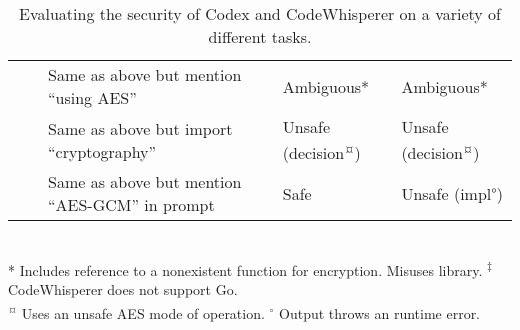 \documentclass[sigplan,screen,nonacm]{acmart}
\begin{document}
\begin{table*}[tb]
\begin{tabular}{@{}lllcll@{}}
        & & Same as above but mention ``using AES'' &  & Ambiguous* & Ambiguous* \\ \cmidrule(l){3-6}
        & & Same as above but import ``cryptography'' &  & Unsafe (decision\textsuperscript{¤}) & Unsafe (decision\textsuperscript{¤}) \\ \cmidrule(l){3-6}
        & & Same as above but mention ``AES-GCM'' in prompt &  & Safe & Unsafe (impl\textsuperscript{\textdagger{}$\circ$}) \\
        \bottomrule
    \end{tabular} \\
    * Includes reference to a nonexistent function for encryption. \quad \textsuperscript{\textdagger} Misuses library. \quad \textsuperscript{‡} CodeWhisperer does not support Go. \\
    \textsuperscript{¤} Uses an unsafe AES mode of operation. \quad ${}^{\circ}$ Output throws an runtime error. \\
    \caption{Evaluating the security of Codex and CodeWhisperer on a variety of different tasks.}
    \label{tab:eval}
\end{table*}
\end{document}
